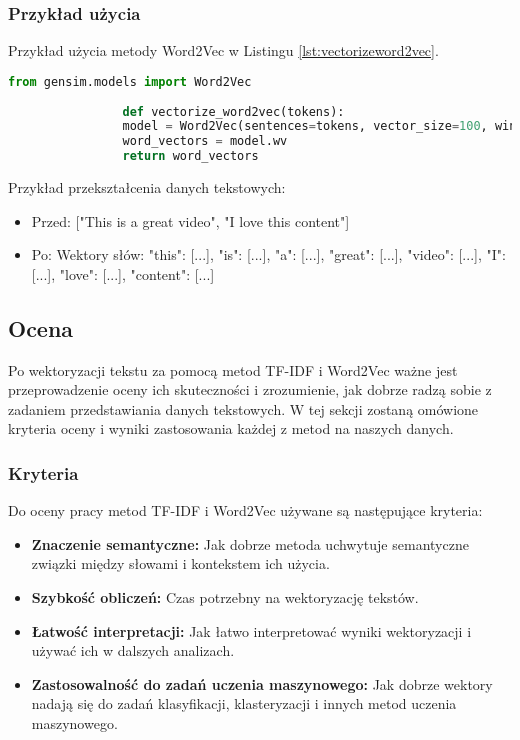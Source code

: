 	
 		\subsubsection{Przykład użycia}
 			Przykład użycia metody Word2Vec w Listingu \ref{lst:vectorizeword2vec}.
 			\begin{lstlisting}[language=Python, caption={Funkcja wektoryzująca za pomocą Word2Vec}, label={lst:vectorizeword2vec}]
				from gensim.models import Word2Vec
	
				def vectorize_word2vec(tokens):
				model = Word2Vec(sentences=tokens, vector_size=100, window=5, min_count=1, workers=4)
				word_vectors = model.wv
				return word_vectors
			\end{lstlisting}

			Przykład przekształcenia danych tekstowych:

			\begin{itemize}
				\item Przed: ["This is a great video", "I love this content"]
				\item Po: Wektory słów: { "this": [...], "is": [...], "a": [...], "great": [...], "video": [...], "I": [...], "love": [...], "content": [...] }
			\end{itemize}
 	
 	\subsection{Ocena}
 		Po wektoryzacji tekstu za pomocą metod TF-IDF i Word2Vec ważne jest przeprowadzenie oceny ich skuteczności i zrozumienie, jak dobrze radzą sobie z zadaniem przedstawiania danych tekstowych. W tej sekcji zostaną omówione kryteria oceny i wyniki zastosowania każdej z metod na naszych danych.
 	
 		\subsubsection{Kryteria}
 			Do oceny pracy metod TF-IDF i Word2Vec używane są następujące kryteria:
 		
			\begin{itemize}
				\item \textbf{Znaczenie semantyczne:} Jak dobrze metoda uchwytuje semantyczne związki między słowami i kontekstem ich użycia.
				\item \textbf{Szybkość obliczeń:} Czas potrzebny na wektoryzację tekstów.
				\item \textbf{Łatwość interpretacji:} Jak łatwo interpretować wyniki wektoryzacji i używać ich w dalszych analizach.
				\item \textbf{Zastosowalność do zadań uczenia maszynowego:} Jak dobrze wektory nadają się do zadań klasyfikacji, klasteryzacji i innych metod uczenia maszynowego.
			\end{itemize}
		
